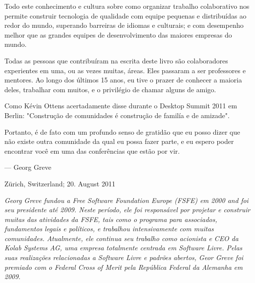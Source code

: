Todo este conhecimento e cultura sobre como organizar trabalho colaborativo
nos permite construir tecnologia de qualidade com equipe pequenas e
distribuídas ao redor do mundo, superando barreiras de idiomas e culturais;
e com desempenho melhor que as grandes equipes de desenvolvimento das
maiores empresas do mundo.

Todas as pessoas que contribuíram na escrita deste livro são colaboradores
experientes em uma, ou as vezes muitas, áreas. Eles passaram a ser professores
e mentores. Ao longo dos últimos 15 anos, eu tive o prazer de conhecer a
maioria deles, trabalhar com muitos, e o privilégio de chamar alguns de
amigo.

Como Kévin Ottens acertadamente disse durante o Desktop Summit 2011 em
Berlin: "Construção de comunidades é construção de familía e de amizade".

Portanto, é de fato com um profundo senso de gratidão que eu posso dizer
que não existe outra comunidade da qual eu possa fazer parte, e eu espero
poder encontrar você em uma das conferências que estão por vir.
\newline
\begin{flushright}--- Georg Greve\end{flushright}
\begin{flushright}Zürich, Switzerland; 20. August 2011\end{flushright}

\textit{Georg Greve fundou a Free Software Foundation Europe (FSFE) em
2000 and foi seu presidente até 2009. Neste período, ele foi responsável
por projetar e construir muitas das atividades da FSFE, tais como o
programa para associados, fundamentos legais e políticos, e trabalhou
intensivamente com muitas comunidades. Atualmente, ele continua seu
trabalho como acionista e CEO da Kolab Systems AG, uma empresa totalmente
centrada em Software Livre. Pelas suas realizações relacionadas
a Software Livre e padrões abertos, Geor Greve foi premiado com o
Federal Cross of Merit pela República Federal da Alemanha em 2009.}

\newpage
